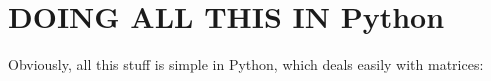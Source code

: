 \documentclass[]{article}
\begin{document}
\section {DOING ALL THIS IN Python}

    Obviously, all this stuff is simple in Python, which deals easily with
matrices:

%
%
%
%
%
\end{document}
